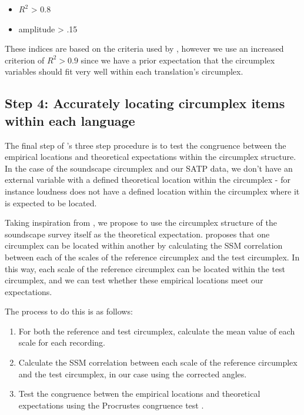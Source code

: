 \documentclass[
  authoryear,
  preprint,
  3p]{elsarticle}
\providecommand{\tightlist}{%
  \setlength{\itemsep}{0pt}\setlength{\parskip}{0pt}}\usepackage{longtable,booktabs,array}
\begin{document}
\begin{itemize}
\tightlist
\item
  \(R^2\) \textgreater{} 0.8
\item
  amplitude \textgreater{} .15
\end{itemize}

These indices are based on the criteria used by \citet{Rogoza2021three},
however we use an increased criterion of \(R^2 > 0.9\) since we have a
prior expectation that the circumplex variables should fit very well
within each translation's circumplex.

\subsection{Step 4: Accurately locating circumplex items within each
language}\label{step-4-accurately-locating-circumplex-items-within-each-language}

The final step of \citet{Rogoza2021three} 's three step procedure is to
test the congruence between the empirical locations and theoretical
expectations within the circumplex structure. In the case of the
soundscape circumplex and our SATP data, we don't have an external
variable with a defined theoretical location within the circumplex - for
instance loudness does not have a defined location within the circumplex
where it is expected to be located.

Taking inspiration from \citet{Yik2004Relationship}, we propose to use
the circumplex structure of the soundscape survey itself as the
theoretical expectation. \citet{Yik2004Relationship} proposes that one
circumplex can be located within another by calculating the SSM
correlation between each of the scales of the reference circumplex and
the test circumplex. In this way, each scale of the reference circumplex
can be located within the test circumplex, and we can test whether these
empirical locations meet our expectations.

The process to do this is as follows:

\begin{enumerate}
\def\labelenumi{\arabic{enumi}.}
\tightlist
\item
  For both the reference and test circumplex, calculate the mean value
  of each scale for each recording.
\item
  Calculate the SSM correlation between each scale of the reference
  circumplex and the test circumplex, in our case using the corrected
  angles.
\item
  Test the congruence betwen the empirical locations and theoretical
  expectations using the Procrustes congruence test
  \citep{Rogoza2021three}.
\end{enumerate}
\end{document}
